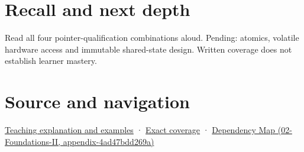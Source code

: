 \section{Recall and next depth}\label{appendix-c25d60fed375-recall-and-next-depth}

Read all four pointer-qualification combinations aloud. Pending: atomics, volatile hardware access and immutable shared-state design. Written coverage does not establish learner mastery.

\section{Source and navigation}\label{appendix-c25d60fed375-source-and-navigation}

\href{Continuous\%20Notes/Computing\%20Foundations\%20-\%20From\%20Bits\%20to\%20C++\%20and\%20Systems\%20APIs\#Read-only\%20is\%20a\%20path,\%20not\%20an\%20ownership\%20or\%20synchronization\%20promise}{Teaching explanation and examples} · \hyperref[appendix-fd090d982a15-m008---parts-113-126]{Exact coverage} · \href{../02-Foundations-II/main.pdf\#nameddest=appendix-4ad47bdd269a}{Dependency Map (02-Foundations-II, appendix-4ad47bdd269a)}
